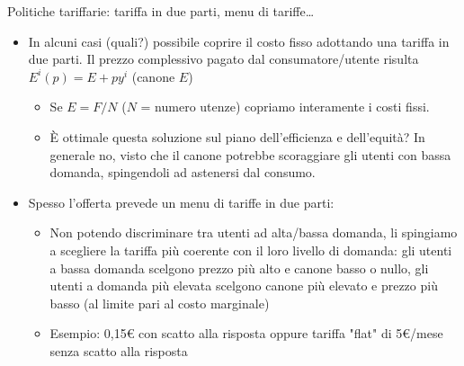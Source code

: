 \documentclass[aspectratio=149,11pt]{beamer}
\begin{document}
\begin{frame}{Politiche tariffarie: tariffa in due parti, menu di tariffe\ldots{}}
\begin{itemize}
\item In alcuni casi (quali?) possibile coprire il costo fisso adottando una
\alert{tariffa in due parti}. Il prezzo complessivo pagato dal consumatore/utente
risulta $E^i(p)=E+py^i$ (canone $E$)
\begin{itemize}
\item Se $E=F/N$ ($N$ = numero utenze) copriamo interamente i costi fissi.
\item È ottimale questa soluzione sul piano dell'efficienza e dell'equità? In
generale no, visto che il canone potrebbe scoraggiare gli utenti con bassa
domanda, spingendoli ad astenersi dal consumo.
\end{itemize}
\item Spesso l'offerta prevede un \alert{menu di tariffe in due parti}:
\begin{itemize}
\item Non potendo discriminare tra utenti ad alta/bassa domanda, li spingiamo a
scegliere la tariffa più coerente con il loro livello di domanda: gli
utenti a bassa domanda scelgono prezzo più alto e canone basso o nullo,
gli utenti a domanda più elevata scelgono canone più elevato e prezzo più
basso (al limite pari al costo marginale)
\item Esempio: 0,15€ con scatto alla risposta oppure tariffa "flat" di 5€/mese
senza scatto alla risposta
\end{itemize}
\end{itemize}
\end{frame}
\end{document}
